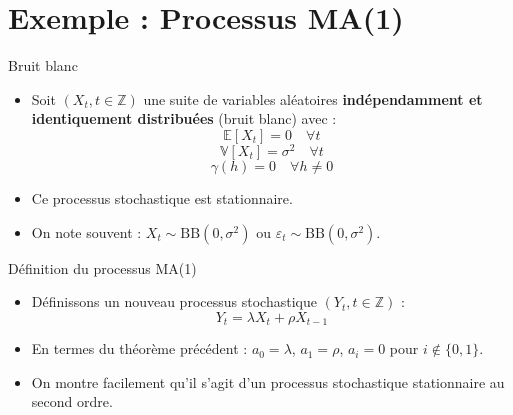 \documentclass[11pt,aspectratio=169]{beamer}
\newcommand{\E}{\mathbb{E}}
\newcommand{\Var}{\mathbb{V}}
\newcommand{\Z}{\mathbb{Z}}
\begin{document}
\section{Exemple : Processus MA(1)}

\begin{frame}{Bruit blanc}

\begin{itemize}

\item Soit $(X_t, t \in \Z)$ une suite de variables aléatoires \textbf{indépendamment et identiquement distribuées} (bruit blanc) avec :
  \[
  \E[X_t] = 0 \quad \forall t
  \]
  \[
  \Var[X_t] = \sigma^2 \quad \forall t
  \]
  \[
  \gamma(h) = 0 \quad \forall h \neq 0
  \]\newline

\item Ce processus stochastique est stationnaire.\newline

\item On note souvent : $X_t \sim \text{BB}(0, \sigma^2)$ ou $\varepsilon_t \sim \text{BB}(0, \sigma^2)$.

\end{itemize}

\end{frame}

\begin{frame}{Définition du processus MA(1)}

\begin{itemize}

\item Définissons un nouveau processus stochastique $(Y_t, t \in \Z)$ :
  \[
  Y_t = \lambda X_t + \rho X_{t-1}
  \]\newline

\item En termes du théorème précédent : $a_0 = \lambda$, $a_1 = \rho$, $a_i = 0$ pour $i \notin \{0, 1\}$.\newline

\item On montre facilement qu'il s'agit d'un processus stochastique stationnaire au second ordre.

\end{itemize}

\end{frame}
\end{document}
